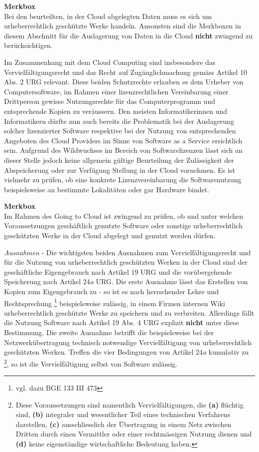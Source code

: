 \documentclass[a4paper,pointlessnumbers]{scrreprt}
\newcommand{\merkbox}[2][0.8\textwidth]{ \begin{center} \begin{tcolorbox}[enhanced, drop fuzzy midday shadow, width={#1}, opacityframe=0.5, colframe=BrickRed, colback=white] {\ECFTeenSpirit \color{BrickRed}\textbf{Merkbox} \qquad {\tiny das gilt es zu beachten}} \\  #2 \end{tcolorbox} \end{center}}
\begin{document}
\merkbox[0.7\textwidth]{Bei den beurteilten, in der Cloud abgelegten Daten muss es sich um urheberrechtlich geschützte Werke handeln. Ansonsten sind die Merkboxen in diesem Abschnitt für die Auslagerung von Daten in die Cloud \textbf{nicht} zwingend zu berücksichtigen.}

Im Zusammenhang mit dem Cloud Computing sind insbesondere das Vervielfältigungsrecht und das Recht auf Zugänglichmachung gemäss Artikel 10 Abs. 2 URG relevant. Diese beiden Schutzrechte erlauben es dem Urheber von Computersoftware, im Rahmen einer lizenzrechtlichen Vereinbarung einer Drittperson gewisse Nutzungsrechte für das Computerprogramm und entsprechende Kopien zu veräussern. Den meisten Informatikerinnen und Informatikern dürfte nun auch bereits die Problematik bei der Auslagerung solcher lizenzierter Software respektive bei der Nutzung von entsprechenden Angeboten des Cloud Providers im Sinne von Software as a Service ersichtlich sein. Aufgrund des Wildwuchses im Bereich von Softwarelizenzen lässt sich an dieser Stelle jedoch keine allgemein gültige Beurteilung der Zulässigkeit der Abspeicherung oder zur Verfügung Stellung in der Cloud vornehmen. Es ist vielmehr zu prüfen, ob eine konkrete Lizenzvereinbarung die Softwarenutzung beispielsweise an bestimmte Lokalitäten oder gar Hardware bindet. 

\merkbox[0.7\textwidth]{Im Rahmen des Going to Cloud ist zwingend zu prüfen, ob und unter welchen Voraussetzungen geschäftlich genutzte Software oder sonstige urheberrechtlich geschützten Werke in der Cloud abgelegt und genutzt werden dürfen.}

\textit{Ausnahmen} - Die wichtigsten beiden Ausnahmen zum Vervielfältigungsrecht und für die Nutzung von urheberrechtlich geschützten Werken in der Cloud sind der geschäftliche Eigengebrauch nach Artikel 19 URG und die vorübergehende Speicherung nach Artikel 24\textit{a} URG. Die erste Ausnahme lässt das Erstellen von Kopien zum Eigengebrauch zu - so ist es nach herrschender Lehre und Rechtsprechung \footnote{vgl. dazu BGE 133 III 473} beispielsweise zulässig, in einem Firmen internen Wiki urheberrechtlich geschützte Werke zu speichern und zu verbreiten. Allerdings fällt die Nutzung Software nach Artikel 19 Abs. 4 URG explizit \textbf{nicht} unter diese Bestimmung. Die zweite Ausnahme betrifft die beispielsweise bei der Netzwerkübertragung technisch notwendige Vervielfältigung von urheberrechtlich geschützten Werken. Treffen die vier Bedingungen von Artikel 24\textit{a} kumulativ zu \footnote{Diese Voraussetzungen sind namentlich Vervielfältigungen, die \textbf{(a)} flüchtig sind, \textbf{(b)} integraler und wesentlicher Teil eines technischen Verfahrens darstellen, \textbf{(c)} ausschliesslich der Übertragung in einem Netz zwischen Dritten durch einen Vermittler oder einer rechtmässigen Nutzung dienen und  \textbf{(d)} keine eigenständige wirtschaftliche Bedeutung haben.}, so ist die Vervielfältigung selbst von Software zulässig.
\end{document}
